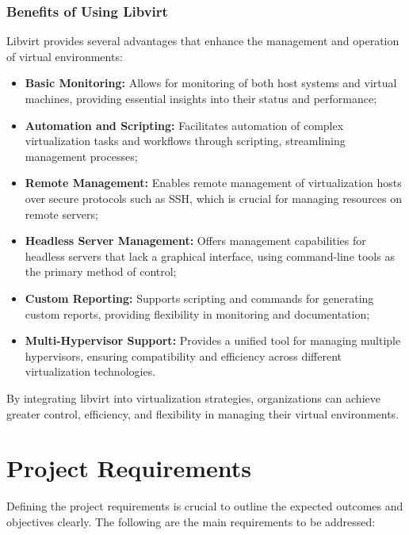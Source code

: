 \subsubsection[Benefits of Using Libvirt]{Benefits of Using Libvirt}
Libvirt provides several advantages that enhance the management and operation of virtual environments:
\begin{itemize}
    \item \textbf{Basic Monitoring:} Allows for monitoring of both host systems and virtual machines, providing essential insights into their status and performance;
    \item \textbf{Automation and Scripting:} Facilitates automation of complex virtualization tasks and workflows through scripting, streamlining management processes;
    \item \textbf{Remote Management:} Enables remote management of virtualization hosts over secure protocols such as SSH, which is crucial for managing resources on remote servers;
    \item \textbf{Headless Server Management:} Offers management capabilities for headless servers that lack a graphical interface, using command-line tools as the primary method of control;
    \item \textbf{Custom Reporting:} Supports scripting and commands for generating custom reports, providing flexibility in monitoring and documentation;
    \item \textbf{Multi-Hypervisor Support:} Provides a unified tool for managing multiple hypervisors, ensuring compatibility and efficiency across different virtualization technologies.
\end{itemize}

By integrating libvirt into virtualization strategies, organizations can achieve greater control, efficiency, and flexibility in managing their virtual environments.

\section{Project Requirements}
Defining the project requirements is crucial to outline the expected outcomes and objectives clearly. The following are the main requirements to be addressed:


